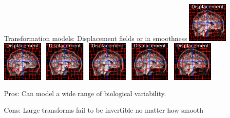 \documentclass{beamer}
\begin{document}
\begin{frame}{Transformation models: Displacement fields}
or in smoothness
\includegraphics[width=0.15\textwidth]{tform_models_disp_1_4}~
\includegraphics[width=0.15\textwidth]{tform_models_disp_2_4}~
\includegraphics[width=0.15\textwidth]{tform_models_disp_3_4}~
\includegraphics[width=0.15\textwidth]{tform_models_disp_4_4}~
\includegraphics[width=0.15\textwidth]{tform_models_disp_5_4}~
\includegraphics[width=0.15\textwidth]{tform_models_disp_6_4}


\alert{Pros}: Can model a wide range of biological variability.

\alert{Cons}:  Large transforms fail to be invertible no matter how smooth


\end{frame}
\end{document}
